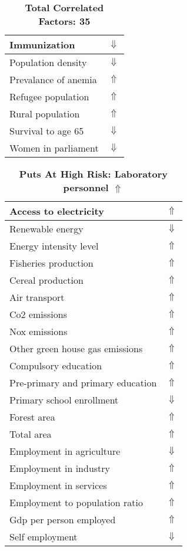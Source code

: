 \documentclass[12pt,notitlepage,oneside]{report}
\begin{document}
\begin{table}[!htb]
\begin{tabular}{|l|l|}
Immunization & $\Downarrow$\\ \hline
Population density & $\Downarrow$\\ \hline
Prevalance of anemia & $\Uparrow$\\ \hline
Refugee population & $\Uparrow$\\ \hline
Rural population & $\Uparrow$\\ \hline
Survival to age 65 & $\Downarrow$\\ \hline
Women in parliament & $\Downarrow$\\ \hline
\end{tabular}
\caption*{\textbf{Total Correlated Factors: 35}}
\end{table}
\clearpage
\begin{table}[!htb]
\caption{\textbf{Puts At High Risk: Laboratory personnel $\Uparrow$}}
\centering
\label{Correlated Socio-economic Factors0}
\begin{tabular}{|l|l|}
\hline
Access to electricity & $\Uparrow$\\ \hline
Renewable energy & $\Downarrow$\\ \hline
Energy intensity level & $\Uparrow$\\ \hline
Fisheries production & $\Uparrow$\\ \hline
Cereal production & $\Uparrow$\\ \hline
Air transport  & $\Uparrow$\\ \hline
Co2 emissions & $\Uparrow$\\ \hline
Nox emissions & $\Uparrow$\\ \hline
Other green house gas emissions & $\Uparrow$\\ \hline
Compulsory education & $\Uparrow$\\ \hline
Pre-primary and primary education & $\Uparrow$\\ \hline
Primary school enrollment & $\Downarrow$\\ \hline
Forest area & $\Uparrow$\\ \hline
Total area & $\Uparrow$\\ \hline
Employment in agriculture & $\Downarrow$\\ \hline
Employment in industry & $\Uparrow$\\ \hline
Employment in services & $\Uparrow$\\ \hline
Employment to population ratio & $\Uparrow$\\ \hline
Gdp per person employed & $\Uparrow$\\ \hline
Self employment & $\Downarrow$\\ \hline

\end{tabular}
\end{table}
\end{document}
